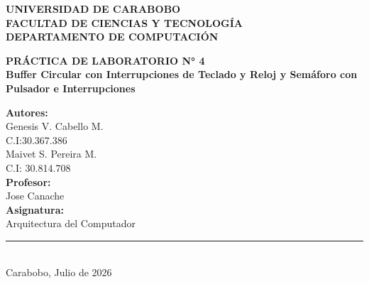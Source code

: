 \documentclass[12pt, a4paper]{article}
\begin{document}
\begin{titlepage}
    \begin{center}
        \textbf{\large UNIVERSIDAD DE CARABOBO} \\
        \textbf{\large FACULTAD DE CIENCIAS Y TECNOLOGÍA} \\
        \textbf{\large DEPARTAMENTO DE COMPUTACIÓN} \\
        \vspace*{0.5cm}
       
        \vspace*{6cm} %
        
        \textbf{\LARGE PRÁCTICA DE LABORATORIO N° 4} \\[0.4cm]
        \textbf{\Large  Buffer Circular con Interrupciones de Teclado y Reloj y Semáforo con Pulsador e Interrupciones } \\
        
        \vspace*{6.8cm} %
        
        \begin{flushright}
            \begin{minipage}{0.5\linewidth}
                \normalsize
                \textbf{Autores:} \\
                Genesis V. Cabello M. \\
                \vspace*{0.3cm}
                C.I:30.367.386\\
                Maivet S. Pereira M.\\
                \vspace*{0.3cm}
                C.I: 30.814.708\\
                \textbf{Profesor:} \\
                \vspace*{0.3cm}
                Jose Canache \\
                \textbf{Asignatura:} \\
                Arquitectura del Computador
            \end{minipage}
        \end{flushright}
        
        \vfill %
        
        \rule{\linewidth}{0.5mm} \\ %
        \vspace*{0.2cm}
        \normalsize Carabobo, Julio de 2026
        
    \end{center}
\end{titlepage}
\end{document}
